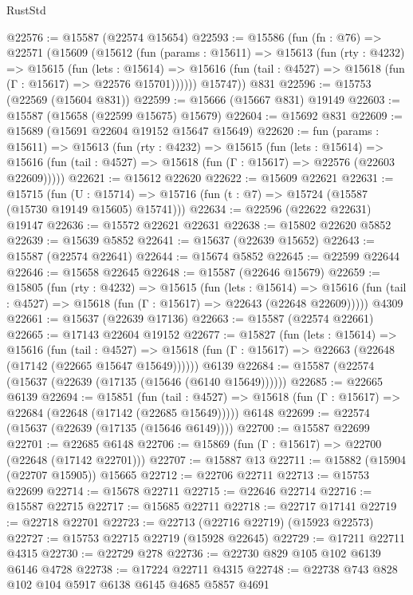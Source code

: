 \begin{lexlean}{RustStd}
\begin{coremodule}
@22576 := @15587 (@22574 @15654)
@22593 := @15586
    (fun (fn : @76) =>
    @22571
      (@15609
        (@15612
          (fun (params : @15611) =>
          @15613
            (fun (rty : @4232) =>
            @15615
              (fun (lets : @15614) =>
              @15616 (fun (tail : @4527) => @15618 (fun (Γ : @15617) => @22576 @15701))))))
        @15747))
    @831
@22596 := @15753 (@22569 (@15604 @831))
@22599 := @15666 (@15667 @831) @19149
@22603 := @15587 (@15658 (@22599 @15675) @15679)
@22604 := @15692 @831
@22609 := @15689 (@15691 @22604 @19152 @15647 @15649)
@22620 := fun (params : @15611) =>
  @15613
    (fun (rty : @4232) =>
    @15615
      (fun (lets : @15614) =>
      @15616 (fun (tail : @4527) => @15618 (fun (Γ : @15617) => @22576 (@22603 @22609)))))
@22621 := @15612 @22620
@22622 := @15609 @22621
@22631 := @15715
    (fun (U : @15714) => @15716 (fun (t : @7) => @15724 (@15587 (@15730 @19149 @15605) @15741)))
@22634 := @22596 (@22622 @22631) @19147
@22636 := @15572 @22621 @22631
@22638 := @15802 @22620 @5852
@22639 := @15639 @5852
@22641 := @15637 (@22639 @15652)
@22643 := @15587 (@22574 @22641)
@22644 := @15674 @5852
@22645 := @22599 @22644
@22646 := @15658 @22645
@22648 := @15587 (@22646 @15679)
@22659 := @15805
    (fun (rty : @4232) =>
    @15615
      (fun (lets : @15614) =>
      @15616 (fun (tail : @4527) => @15618 (fun (Γ : @15617) => @22643 (@22648 @22609)))))
    @4309
@22661 := @15637 (@22639 @17136)
@22663 := @15587 (@22574 @22661)
@22665 := @17143 @22604 @19152
@22677 := @15827
    (fun (lets : @15614) =>
    @15616
      (fun (tail : @4527) =>
      @15618 (fun (Γ : @15617) => @22663 (@22648 (@17142 (@22665 @15647 @15649))))))
    @6139
@22684 := @15587 (@22574 (@15637 (@22639 (@17135 (@15646 (@6140 @15649))))))
@22685 := @22665 @6139
@22694 := @15851
    (fun (tail : @4527) => @15618 (fun (Γ : @15617) => @22684 (@22648 (@17142 (@22685 @15649)))))
    @6148
@22699 := @22574 (@15637 (@22639 (@17135 (@15646 @6149))))
@22700 := @15587 @22699
@22701 := @22685 @6148
@22706 := @15869 (fun (Γ : @15617) => @22700 (@22648 (@17142 @22701)))
@22707 := @15887 @13
@22711 := @15882 (@15904 (@22707 @15905)) @15665
@22712 := @22706 @22711
@22713 := @15753 @22699
@22714 := @15678 @22711
@22715 := @22646 @22714
@22716 := @15587 @22715
@22717 := @15685 @22711
@22718 := @22717 @17141
@22719 := @22718 @22701
@22723 := @22713 (@22716 @22719) (@15923 @22573)
@22727 := @15753 @22715 @22719 (@15928 @22645)
@22729 := @17211 @22711 @4315
@22730 := @22729 @278
@22736 := @22730 @829 @105 @102 @6139 @6146 @4728
@22738 := @17224 @22711 @4315
@22748 := @22738 @743 @828 @102 @104 @5917 @6138 @6145 @4685 @5857 @4691

\end{coremodule}
\end{lexlean}
